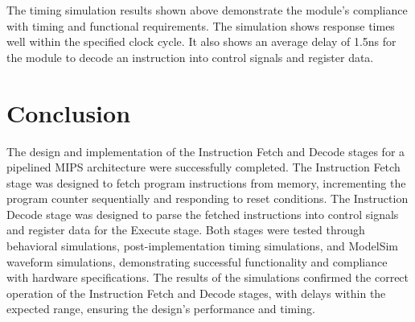 \documentclass[CMPE]{../KGCOEReport}
\begin{document}
The timing simulation results shown above demonstrate the module's compliance with timing and functional requirements. The simulation shows response times well within the specified clock cycle. It also shows an average delay of 1.5ns for the module to decode an instruction into control signals and register data.

\section*{Conclusion}

The design and implementation of the Instruction Fetch and Decode stages for a pipelined MIPS architecture were successfully completed. The Instruction Fetch stage was designed to fetch program instructions from memory, incrementing the program counter sequentially and responding to reset conditions. The Instruction Decode stage was designed to parse the fetched instructions into control signals and register data for the Execute stage. Both stages were tested through behavioral simulations, post-implementation timing simulations, and ModelSim waveform simulations, demonstrating successful functionality and compliance with hardware specifications. The results of the simulations confirmed the correct operation of the Instruction Fetch and Decode stages, with delays within the expected range, ensuring the design's performance and timing.

\newpage

\end{document}

